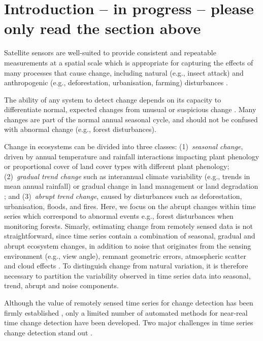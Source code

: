 \documentclass[authoryear,preprint,review,10pt]{elsarticle}
\begin{document}
\section{Introduction -- in progress -- please only read the section above}


Satellite sensors are well-suited to provide consistent and repeatable
measurements at a spatial scale which is appropriate for capturing the effects
of many processes that cause change, including natural (e.g., insect attack) and
anthropogenic (e.g., deforestation, urbanisation, farming) disturbances
\citep{Jin2005}. 

The ability of any system to detect change depends on its capacity to
differentiate normal, expected changes from unusual or suspicious change
\citep{Hargrove2009}. Many changes are part of the normal annual seasonal cycle,
and should not be confused with abnormal change (e.g., forest disturbances).

Change in ecosystems can be divided into three classes: (1)~\emph{seasonal
change}, driven by annual temperature and rainfall interactions impacting plant
phenology or proportional cover of land cover types with different plant
phenology; (2)~\emph{gradual trend change} such as interannual climate
variability (e.g., trends in mean annual rainfall) or gradual change in land
management or land degradation \citep{Lambin2006}; and (3)~\emph{abrupt trend
change}, caused by disturbances such as deforestation, urbanisation, floods, and
fires. Here, we focus on the abrupt changes within time series which correspond
to abnormal events e.g., forest disturbances when monitoring forests. Simarly,
estimating change from remotely sensed data is not straightforward, since time
series contain a combination of seasonal, gradual and abrupt ecosystem changes,
in addition to noise that originates from the sensing environment (e.g., view
angle), remnant geometric errors, atmospheric scatter and cloud effects
\citep{Roy2002,Wolfe1998}. To distinguish change from natural variation, it is
therefore necessary to partition the variability observed in time series data
into seasonal, trend, abrupt and noise components.

Although the value of remotely sensed time series for change detection has been
firmly established \citep{deBeurs:2005jq, Verbesselt2009a}, only a limited
number of automated methods for near-real time change detection have been
developed. Two major challenges in time series change detection stand out .
\end{document}
